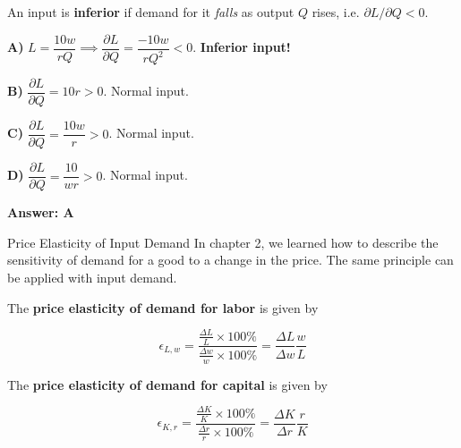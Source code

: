 \documentclass{beamer}
\begin{document}
\begin{frame}

  \bigskip
  An input is \textbf{inferior} if demand for it \emph{falls} as output $Q$ rises, i.e. $\partial L/\partial Q < 0$.

  \bigskip
  \textbf{A)} $L = \dfrac{10w}{rQ} \implies \dfrac{\partial L}{\partial Q} = \dfrac{-10w}{rQ^2} < 0$. \textbf{Inferior input!}

  \bigskip
  \textbf{B)} $\dfrac{\partial L}{\partial Q} = 10r > 0$. Normal input.

  \bigskip
  \textbf{C)} $\dfrac{\partial L}{\partial Q} = \dfrac{10w}{r} > 0$. Normal input.

  \bigskip
  \textbf{D)} $\dfrac{\partial L}{\partial Q} = \dfrac{10}{wr} > 0$. Normal input.

  \bigskip
  \textbf{Answer: A}
\end{frame}

\begin{frame}{Price Elasticity of Input Demand}
  In chapter 2, we learned how to describe the sensitivity of demand for a good to a change in the price. The same principle can be applied with input demand.

  \bigskip
  The \textbf{price elasticity of demand for labor} is given by

  \begin{equation*}
    \epsilon_{L,w}=\frac{\frac{\Delta L}{L}\times 100\%}{\frac{\Delta w}{w} \times 100 \%} = \frac{\Delta L}{\Delta w}\frac{w}{L}
  \end{equation*}

  \bigskip
  The \textbf{price elasticity of demand for capital} is given by

  \begin{equation*}
    \epsilon_{K,r}=\frac{\frac{\Delta K}{K}\times 100\%}{\frac{\Delta r}{r} \times 100 \%} = \frac{\Delta K}{\Delta r}\frac{r}{K}
  \end{equation*}
\end{frame}
\end{document}
